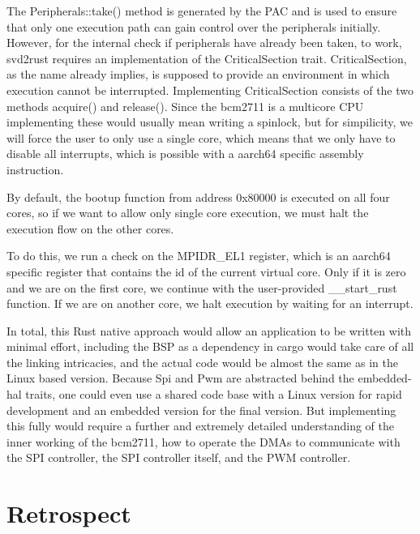 The Peripherals::take() method is generated by the PAC and is used to ensure that only one execution path can gain control over the peripherals initially.
However, for the internal check if peripherals have already been taken, to work, svd2rust requires an implementation of the CriticalSection trait.
CriticalSection, as the name already implies, is supposed to provide an environment in which execution cannot be interrupted.
Implementing CriticalSection consists of the two methods acquire() and release().
Since the bcm2711 is a multicore CPU implementing these would usually mean writing a spinlock,
but for simpilicity, we will force the user to only use a single core, which means that we only have to disable all interrupts,
which is possible with a aarch64 specific assembly instruction.



By default, the bootup function from address 0x80000 is executed on all four cores,
so if we want to allow only single core execution, we must halt the execution flow on the other cores.

To do this, we run a check on the MPIDR\_EL1 register, which is an aarch64 specific register that contains the id of the current virtual core.
Only if it is zero and we are on the first core, we continue with the user-provided \_\_start\_rust function.
If we are on another core, we halt execution by waiting for an interrupt.



In total, this Rust native approach would allow an application to be written with minimal effort,
including the BSP as a dependency in cargo would take care of all the linking intricacies,
and the actual code would be almost the same as in the Linux based version.
Because Spi and Pwm are abstracted behind the embedded-hal traits, one could even use a shared code base with a Linux version for rapid development
and an embedded version for the final version.
But implementing this fully would require a further and extremely detailed understanding of the inner working of the bcm2711,
how to operate the DMAs to communicate with the SPI controller, the SPI controller itself, and the PWM controller.

\section{Retrospect}

